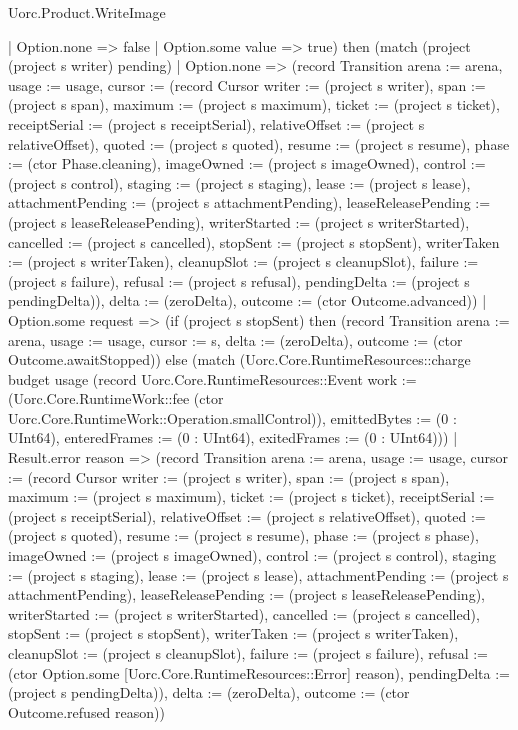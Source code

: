 \begin{lexlean}{Uorc.Product.WriteImage}
\begin{semanticmodule}
{      | Option.none => false
      | Option.some value => true) then (match (project (project s writer) pending)
      | Option.none => (record Transition {arena := arena, usage := usage, cursor := (record Cursor {writer := (project s writer), span := (project s span), maximum := (project s maximum), ticket := (project s ticket), receiptSerial := (project s receiptSerial), relativeOffset := (project s relativeOffset), quoted := (project s quoted), resume := (project s resume), phase := (ctor Phase.cleaning), imageOwned := (project s imageOwned), control := (project s control), staging := (project s staging), lease := (project s lease), attachmentPending := (project s attachmentPending), leaseReleasePending := (project s leaseReleasePending), writerStarted := (project s writerStarted), cancelled := (project s cancelled), stopSent := (project s stopSent), writerTaken := (project s writerTaken), cleanupSlot := (project s cleanupSlot), failure := (project s failure), refusal := (project s refusal), pendingDelta := (project s pendingDelta)}), delta := (zeroDelta), outcome := (ctor Outcome.advanced)})
      | Option.some request => (if (project s stopSent) then (record Transition {arena := arena, usage := usage, cursor := s, delta := (zeroDelta), outcome := (ctor Outcome.awaitStopped)}) else (match (Uorc.Core.RuntimeResources::charge budget usage (record Uorc.Core.RuntimeResources::Event {work := (Uorc.Core.RuntimeWork::fee (ctor Uorc.Core.RuntimeWork::Operation.smallControl)), emittedBytes := (0 : UInt64), enteredFrames := (0 : UInt64), exitedFrames := (0 : UInt64)}))
        | Result.error reason => (record Transition {arena := arena, usage := usage, cursor := (record Cursor {writer := (project s writer), span := (project s span), maximum := (project s maximum), ticket := (project s ticket), receiptSerial := (project s receiptSerial), relativeOffset := (project s relativeOffset), quoted := (project s quoted), resume := (project s resume), phase := (project s phase), imageOwned := (project s imageOwned), control := (project s control), staging := (project s staging), lease := (project s lease), attachmentPending := (project s attachmentPending), leaseReleasePending := (project s leaseReleasePending), writerStarted := (project s writerStarted), cancelled := (project s cancelled), stopSent := (project s stopSent), writerTaken := (project s writerTaken), cleanupSlot := (project s cleanupSlot), failure := (project s failure), refusal := (ctor Option.some [Uorc.Core.RuntimeResources::Error] reason), pendingDelta := (project s pendingDelta)}), delta := (zeroDelta), outcome := (ctor Outcome.refused reason)})
}
\end{semanticmodule}
\end{lexlean}
